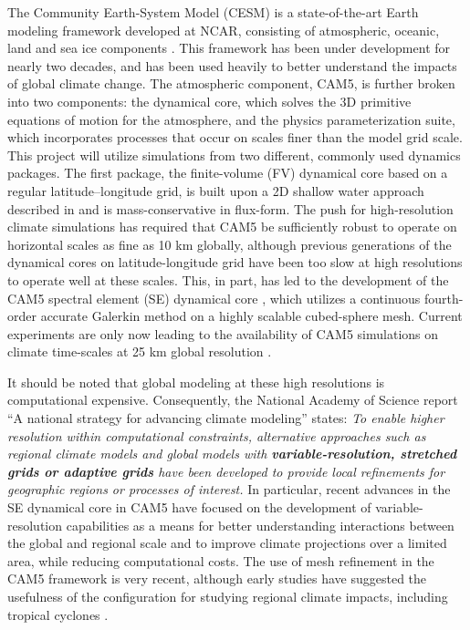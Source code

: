 \documentclass[11pt]{article}
\begin{document}
The Community Earth-System Model (CESM) is a state-of-the-art Earth modeling framework developed at NCAR, consisting of atmospheric, oceanic, land and sea ice components  \citep{RBNetal2010NCAR}.  This framework has been under development for nearly two decades, and has been used heavily to better understand the impacts of global climate change.  The atmospheric component, CAM5, is further broken into two components: the dynamical core, which solves the 3D primitive equations of motion for the atmosphere, and the physics parameterization suite, which incorporates processes that occur on scales finer than the model grid scale. This project will utilize simulations from two different, commonly used dynamics packages. The first package, the finite-volume (FV) dynamical core based on a regular latitude--longitude grid, is built upon a 2D shallow water approach described in \citet{Lin1996,Lin1997} and is mass-conservative in flux-form. The push for high-resolution climate simulations has required that CAM5 be sufficiently robust to operate on horizontal scales as fine as 10 km globally, although previous generations of the dynamical cores on latitude-longitude grid have been too slow at high resolutions to operate well at these scales.  This, in part, has led to the development of the CAM5 spectral element (SE) dynamical core \citep{dennis2012cam}, which utilizes a continuous fourth-order accurate Galerkin method on a highly scalable cubed-sphere mesh.  Current experiments are only now leading to the availability of CAM5 simulations on climate time-scales at 25 km global resolution \citep{Bacmeister2014, Wehner2014, Wehner2015, Reed2015b}.

It should be noted that global modeling at these high resolutions is computational expensive.  Consequently, the National Academy of Science report ``A national strategy for advancing climate modeling'' states: \textit{To enable higher resolution within computational constraints, alternative approaches such as regional climate models and global models with \textbf{variable-resolution, stretched grids or adaptive grids} have been developed to provide local refinements for geographic regions or processes of interest.}  In particular, recent advances in the SE dynamical core in CAM5 have focused on the development of variable-resolution capabilities as a means for better understanding interactions between the global and regional scale and to improve climate projections over a limited area, while reducing computational costs. The use of mesh refinement in the CAM5 framework is very recent, although early studies have suggested the usefulness of the configuration for studying regional climate impacts, including tropical cyclones \citep{Zarzycki2014multidecadal, Zarzycki2015clim}.
\end{document}
